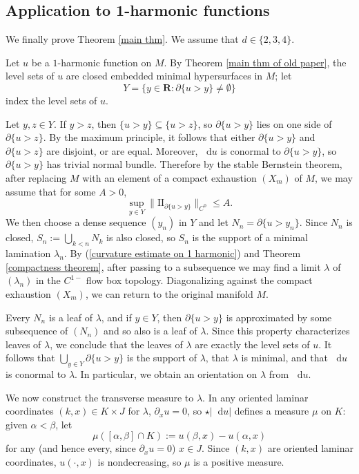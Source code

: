 \documentclass[reqno,11pt]{amsart}
\newcommand{\RR}{\mathbf{R}}
\newcommand*\dif{\mathop{}\!\mathrm{d}}
\newcommand{\Two}{\mathrm{I\!I}}
\theoremstyle{definition}
\numberwithin{equation}{section}
\begin{document}
\subsection{Application to 1-harmonic functions}
We finally prove Theorem \ref{main thm}.
We assume that $d \in \{2, 3, 4\}$.

Let $u$ be a $1$-harmonic function on $M$.
By Theorem \ref{main thm of old paper}, the level sets of $u$ are closed embedded minimal hypersurfaces in $M$; let
$$Y = \{y \in \RR: \partial \{u > y\} \neq \emptyset\}$$
index the level sets of $u$.

Let $y, z \in Y$. If $y > z$, then $\{u > y\} \subseteq \{u > z\}$, so $\partial \{u > y\}$ lies on one side of $\partial \{u > z\}$.
By the maximum principle, it follows that either $\partial \{u > y\}$ and $\partial \{u > z\}$ are disjoint, or are equal.
Moreover, $\dif u$ is conormal to $\partial \{u > y\}$, so $\partial \{u > y\}$ has trivial normal bundle.
Therefore by the stable Bernstein theorem, after replacing $M$ with an element of a compact exhaustion $(X_m)$ of $M$, we may assume that for some $A > 0$,
\begin{equation}\label{curvature estimate on 1 harmonic}
	\sup_{y \in Y} \|\Two_{\partial \{u > y\}}\|_{C^0} \leq A.
\end{equation}
We then choose a dense sequence $(y_n)$ in $Y$ and let $N_n = \partial \{u > y_n\}$.
Since $N_n$ is closed, $S_n := \bigcup_{k < n} N_k$ is also closed, so $S_n$ is the support of a minimal lamination $\lambda_n$.
By (\ref{curvature estimate on 1 harmonic}) and Theorem \ref{compactness theorem}, after passing to a subsequence we may find a limit $\lambda$ of $(\lambda_n)$ in the $C^{1-}$ flow box topology.
Diagonalizing against the compact exhaustion $(X_m)$, we can return to the original manifold $M$.

Every $N_n$ is a leaf of $\lambda$, and if $y \in Y$, then $\partial \{u > y\}$ is approximated by some subsequence of $(N_n)$ and so also is a leaf of $\lambda$.
Since this property characterizes leaves of $\lambda$, we conclude that the leaves of $\lambda$ are exactly the level sets of $u$.
It follows that $\bigcup_{y \in Y} \partial \{u > y\}$ is the support of $\lambda$, that $\lambda$ is minimal, and that $\dif u$ is conormal to $\lambda$.
In particular, we obtain an orientation on $\lambda$ from $\dif u$.

We now construct the transverse measure to $\lambda$.
In any oriented laminar coordinates $(k, x) \in K \times J$ for $\lambda$, $\partial_x u = 0$, so $\star |\dif u|$ defines a measure $\mu$ on $K$: given $\alpha < \beta$, let
$$\mu([\alpha, \beta] \cap K) := u(\beta, x) - u(\alpha, x)$$
for any (and hence every, since $\partial_x u = 0$) $x \in J$.
Since $(k, x)$ are oriented laminar coordinates, $u(\cdot, x)$ is nondecreasing, so $\mu$ is a positive measure.
\end{document}
